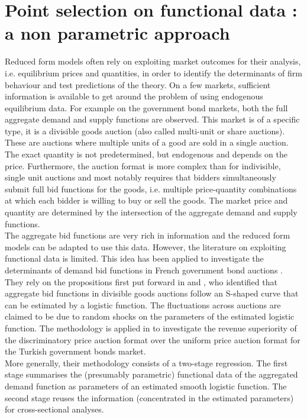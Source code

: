 \section{Point selection on functional data : a non parametric approach}
Reduced form models often rely on exploiting market outcomes for their analysis, i.e. equilibrium prices and quantities, in order to identify the determinants of firm behaviour and test predictions of the theory. On a few markets, sufficient information is available to get around the problem of using endogenous equilibrium data. For example on the government bond markets, both the full aggregate demand and supply functions are observed. This market is of a specific type, it is a divisible goods auction (also called multi-unit or share auctions). These are auctions where multiple units of a good are sold in a single auction. The exact quantity is not predetermined, but endogenous and depends on the price. Furthermore, the auction format is more complex than for indivisible, single unit auctions and most notably requires that bidders simultaneously submit full bid functions for the goods, i.e. multiple price-quantity combinations at which each bidder is willing to buy or sell the goods. The market price and quantity are determined by the intersection of the aggregate demand and supply functions.\\

The aggregate bid functions are very rich in information and the reduced form models can be adapted to use this data. However, the literature on exploiting functional data is limited. This idea has been applied to investigate the determinants of demand bid functions in French government bond auctions \cite{preget2005treasury}. They rely on the propositions first put forward in \cite{boukai1998market} and \cite{berg1999bid}, who identified that aggregate bid functions in divisible goods auctions follow an S-shaped curve that can be estimated by a logistic function. The fluctuations across auctions are claimed to be due to random shocks on the parameters of the estimated logistic function. The methodology is applied in \cite{ozcan2004logistic} to investigate the revenue superiority of the discriminatory price auction format over the uniform price auction format for the Turkish government bonds market.\\

More generally, their methodology consists of a two-stage regression. The first stage summarises the (presumably parametric) functional data of the aggregated demand function as parameters of an estimated smooth logistic function. The second stage reuses the information (concentrated in the estimated parameters) for cross-sectional analyses.\\

